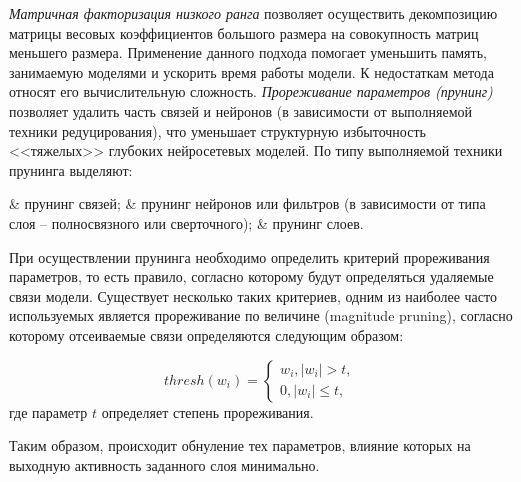 \textit{Матричная факторизация низкого ранга} позволяет осуществить декомпозицию матрицы весовых коэффициентов большого размера на совокупность матриц меньшего размера. Применение данного подхода помогает уменьшить память, занимаемую моделями и ускорить время работы модели. К недостаткам метода относят его вычислительную сложность.
\textit{Прореживание параметров (прунинг)} позволяет удалить часть связей и нейронов (в зависимости от выполняемой техники редуцирования), что уменьшает структурную избыточность <<тяжелых>> глубоких нейросетевых моделей.
По типу выполняемой техники прунинга выделяют:

\begin{easylist}
	& прунинг связей;
	& прунинг нейронов или фильтров (в зависимости от типа слоя -- полносвязного или сверточного);
	& прунинг слоев.
\end{easylist}

При осуществлении прунинга необходимо определить критерий прореживания параметров, то есть правило, согласно которому будут определяться удаляемые связи модели. 
Существует несколько таких критериев, одним из наиболее часто используемых является прореживание по величине (magnitude pruning), согласно которому отсеиваемые связи определяются следующим образом:
 
\begin{equation*}
	thresh(w_i) = 
	\begin{cases}
		w_i, |w_i| > t,\\
		0, |w_i| \leq t,
	\end{cases}
\end{equation*}
где параметр $t$ определяет степень прореживания.

Таким образом, происходит обнуление тех параметров, влияние которых на выходную активность заданного слоя минимально.


